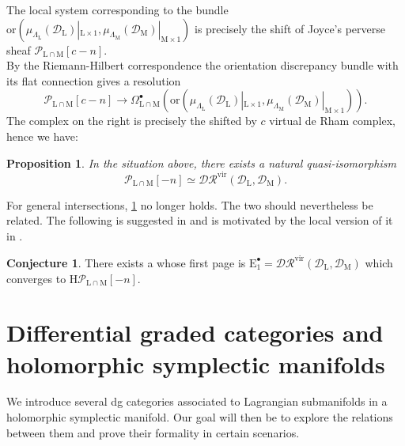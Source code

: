 \documentclass{article}
\theoremstyle{plain}
\newtheorem{proposition}[theorem]{Proposition}
\theoremstyle{definition}
\newtheorem{conjecture}[theorem]{Conjecture}
\theoremstyle{remark}
\newcommand{\mr}{\mathrm}
\newcommand{\3}{\vspace{3mm}}
\newcommand{\2}{\vspace{2mm}}
\newcommand{\1}{\vspace{1mm}}
\begin{document}
 The local system corresponding to the bundle $\mr{or}\left(\mu_{\Lambda_\mr{L}}\left(\mathscr{D}_\mr{L}\right)|_{\mr{L}\times 1},\mu_{\Lambda_\mr{M}}\left(\mathscr{D}_\mr{M}\right)|_{\mr{M}\times 1}\right)$ is precisely the shift of Joyce's perverse sheaf $\mathscr{P}_{\mr{L}\cap\mr{M}}[c-n]$.\\
 By the Riemann-Hilbert correspondence the orientation discrepancy bundle with its flat connection gives a resolution $$\mathscr{P}_{\mr{L}\cap\mr{M}}[c-n] \to \Omega_{\mr{L}\cap \mr{M}}^{\bullet}\left(\mr{or}\left(\mu_{\Lambda_\mr{L}}\left(\mathscr{D}_\mr{L}\right)|_{\mr{L}\times 1},\mu_{\Lambda_\mr{M}}\left(\mathscr{D}_\mr{M}\right)|_{\mr{M}\times 1}\right)\right).$$ The complex on the right is precisely the shifted by $c$ virtual de Rham complex, hence we have:
  \begin{proposition}\label{pdr}
In the situation above, there exists a natural quasi-isomorphism $$ \mathscr{P}_{\mr{L}\cap\mr{M}}[-n]\simeq\mathscr{DR}^{\mr{vir}}\left(\mathscr{D}_{\mr{L}},\mathscr{D}_{\mr{M}}\right).$$
 \end{proposition}
 For general intersections, \cref{pdr} no longer holds. The two should nevertheless be related. The following is suggested in \cite{MR2641169} and is motivated by the local version of it in \cite{MR1181207}.
 \2
 \begin{conjecture}
 There exists a whose first page is $\mr{E}_1^\bullet = \mathscr{DR}^{\mr{vir}}\left(\mathscr{D}_{\mr{L}},\mathscr{D}_{\mr{M}}\right)$ which converges to $\mr{H}\mathscr{P}_{\mr{L}\cap\mr{M}}[-n]$.	
 \end{conjecture}  
\section{Differential graded categories and holomorphic symplectic manifolds}\label{sec4}

We introduce several dg categories associated to Lagrangian submanifolds in a holomorphic symplectic manifold. Our goal will then be to explore the relations between them and prove their formality in certain scenarios.
\end{document}
